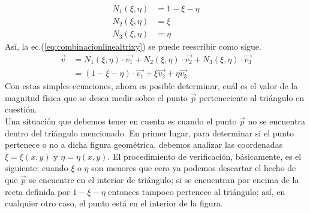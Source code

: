 \begin{equation}
  \label{eq:fftridechieta}
  \begin{split}
    N_1(\xi,\eta) & = 1 - \xi - \eta \\
    N_2(\xi,\eta) & = \xi            \\
    N_3(\xi,\eta) & = \eta           
  \end{split}
\end{equation}
Así, la ec.(\ref{eq:combinacionlinealtrixy}) se puede reescribir como sigue.
\begin{equation}
  \label{eq:combinacionlinealtrichieta}  
  \begin{split}
    \vec{v} & = 
    N_{1}(\xi,\eta) \cdot \vec{v_1} + N_{2}(\xi,\eta) \cdot \vec{v_2}
    + N_{3}(\xi,\eta) \cdot \vec{v_3} \\
    & = (1-\xi-\eta) \cdot \vec{v_1} + \xi\vec{v_2} + \eta\vec{v_3}
    \end{split}
\end{equation}
Con estas simples ecuaciones, ahora es posible determinar, cuál es el valor de la magnitud física que se desea medir sobre el punto $\vec{p}$ perteneciente al triángulo en cuestión.
\\
Una situación que debemos tener en cuenta es cuando el punto $\vec{p}$ no se encuentra dentro del triángulo mencionado. En primer lugar, para determinar si el punto pertenece o no a dicha figura geométrica, debemos analizar las coordenadas $\xi= \xi(x,y)$ y $\eta= \eta(x,y)$. El procedimiento de verificación, básicamente, es el siguiente: cuando $\xi$ o $\eta$ son menores que cero ya podemos descartar el hecho de que $\vec{p}$ se encuentre en el interior de triángulo; si se encuentran por encima de la recta definida por $1-\xi-\eta$ entonces tampoco pertenece al triángulo; así, en cualquier otro caso, el punto está en el interior de la figura. 

